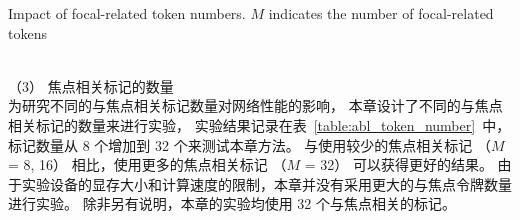 \begin{table}[!t]
	{Impact of focal-related token numbers. $M$ indicates the number of focal-related tokens}
	\centering
	\label{table:abl_token_number}
	
\end{table}
\\
%
%
%
%
\indent
%
（3）
焦点相关标记的数量
\\
%
%
%
%
\indent
为研究不同的与焦点相关标记数量对网络性能的影响，
本章设计了不同的与焦点相关标记的数量来进行实验，
实验结果记录在表~\ref{table:abl_token_number}~中，
标记数量从 8 个增加到 32 个来测试本章方法。
与使用较少的焦点相关标记
（$M$ = 8, 16） 
相比，使用更多的焦点相关标记
（$M$ = 32）
可以获得更好的结果。 
由于实验设备的显存大小和计算速度的限制，本章并没有采用更大的与焦点令牌数量进行实验。
除非另有说明，本章的实验均使用 32 个与焦点相关的标记。
\\
%
%
%
%
\indent
